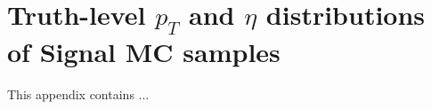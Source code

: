 \section{Truth-level \texorpdfstring{$p_{T}$}{pt} and \texorpdfstring{$\eta$}{eta} distributions of Signal MC samples}
\label{app:signal_truth}

This appendix contains ...
